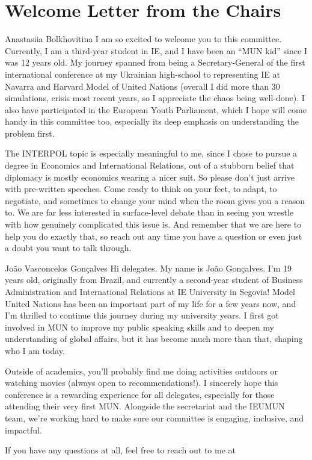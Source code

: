 \section{Welcome Letter from the Chairs}

\begin{chairletter}{Anastasiia Bolkhovitina}
I am so excited to welcome you to this committee. Currently, I am a third-year student in IE, and I have been an ``MUN kid'' since I was 12 years old. My journey spanned from being a Secretary-General of the first international conference at my Ukrainian high-school to representing IE at Navarra and Harvard Model of United Nations (overall I did more than 30 simulations, crisis most recent years, so I appreciate the chaos being well-done). I also have participated in the European Youth Parliament, which I hope will come handy in this committee too, especially its deep emphasis on understanding the problem first.

The INTERPOL topic is especially meaningful to me, since I chose to pursue a degree in Economics and International Relations, out of a stubborn belief that diplomacy is mostly economics wearing a nicer suit. So please don't just arrive with pre-written speeches. Come ready to think on your feet, to adapt, to negotiate, and sometimes to change your mind when the room gives you a reason to. We are far less interested in surface-level debate than in seeing you wrestle with how genuinely complicated this issue is. And remember that we are here to help you do exactly that, so reach out any time you have a question or even just a doubt you want to talk through.

\end{chairletter}


\begin{chairletter}{João Vasconcelos Gonçalves}
Hi delegates. My name is João Gonçalves. I'm 19 years old, originally from Brazil, and currently a second-year student of Business Administration and International Relations at IE University in Segovia! Model United Nations has been an important part of my life for a few years now, and I'm thrilled to continue this journey during my university years. I first got involved in MUN to improve my public speaking skills and to deepen my understanding of global affairs, but it has become much more than that, shaping who I am today.

Outside of academics, you'll probably find me doing activities outdoors or watching movies (always open to recommendations!). I sincerely hope this conference is a rewarding experience for all delegates, especially for those attending their very first MUN. Alongside the secretariat and the IEUMUN team, we're working hard to make sure our committee is engaging, inclusive, and impactful.

If you have any questions at all, feel free to reach out to me at 

\end{chairletter}
